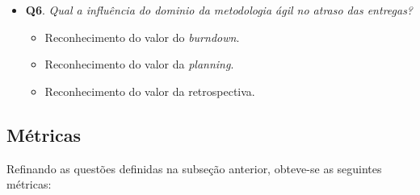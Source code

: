 \begin{itemize}
	 \item \textbf{Q6}. \textit{Qual a influência do dominio da metodologia ágil no atraso das entregas?}
	 	\begin{itemize}
			\item Reconhecimento do valor do \textit{burndown}.
			\item Reconhecimento do valor da \textit{planning}.
			\item Reconhecimento do valor da retrospectiva.
		\end{itemize}

	\end{itemize}


      \subsection{Métricas}

	Refinando as questões definidas na subseção anterior, obteve-se as seguintes métricas:

